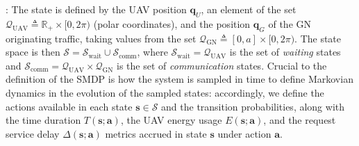 \documentclass[12pt, draftcls, onecolumn]{IEEEtran}
\theoremstyle{plain}
\theoremstyle{definition}
\theoremstyle{remark}
\begin{document}
: The state is defined by the UAV position $\mathbf{q}_{U}$, an element of the set $\mathcal{Q}_{\mathrm{UAV}}{\triangleq}\mathbb{R}_{+}{\times}[0,2\pi)$ (polar coordinates), and the position $\mathbf{q}_{G}$ of the GN originating traffic, taking values from the set  $\mathcal{Q}_{\mathrm{GN}}{\triangleq}[0,a]{\times}[0,2\pi)$. The state space is then $\mathcal{S}{=}\mathcal{S}_{\mathrm{wait}}\cup\mathcal{S}_{\mathrm{comm}}$, where $\mathcal{S}_{\mathrm{wait}}{=}\mathcal{Q}_{\mathrm{UAV}}$ is the set of \emph{waiting} states and $\mathcal{S}_{\mathrm{comm}}{=}\mathcal{Q}_{\mathrm{UAV}}{\times}\mathcal{Q}_{\mathrm{GN}}$ is the set of \emph{communication} states. Crucial to the definition of the SMDP is how the system is sampled in time to define Markovian dynamics in the evolution of the sampled states: accordingly, we define the actions available in each state $\mathbf{s}{\in}\mathcal{S}$ and the transition probabilities, along with the time duration $T(\mathbf{s};\mathbf{a})$, the UAV energy usage $E(\mathbf{s};\mathbf{a})$, and the request service delay $\Delta(\mathbf{s};\mathbf{a})$ metrics accrued in state $\mathbf{s}$ under action $\mathbf{a}$.
\end{document}
